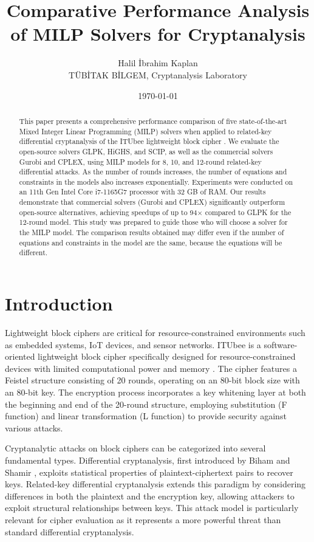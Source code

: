 \documentclass[11pt,a4paper]{article}
\title{Comparative Performance Analysis of MILP Solvers for Cryptanalysis}
\author{Halil İbrahim Kaplan\\TÜBİTAK BİLGEM, Cryptanalysis Laboratory}
\date{\today}
\begin{document}
\maketitle

\begin{abstract}
This paper presents a comprehensive performance comparison of five state-of-the-art Mixed Integer Linear Programming (MILP) solvers when applied to related-key differential cryptanalysis of the ITUbee lightweight block cipher \cite{karakoc2013itubee}. We evaluate the open-source solvers GLPK, HiGHS, and SCIP, as well as the commercial solvers Gurobi and CPLEX, using MILP models for 8, 10, and 12-round related-key differential attacks. As the number of rounds increases, the number of equations and constraints in the models also increases exponentially. Experiments were conducted on an 11th Gen Intel Core i7-1165G7 processor with 32 GB of RAM. Our results demonstrate that commercial solvers (Gurobi and CPLEX) significantly outperform open-source alternatives, achieving speedups of up to 94$\times$ compared to GLPK for the 12-round model. This study was prepared to guide those who will choose a solver for the MILP model. The comparison results obtained may differ even if the number of equations and constraints in the model are the same, because the equations will be different.
\end{abstract}

\section{Introduction}
Lightweight block ciphers are critical for resource-constrained environments such as embedded systems, IoT devices, and sensor networks. ITUbee is a software-oriented lightweight block cipher specifically designed for resource-constrained devices with limited computational power and memory \cite{karakoc2013itubee}. The cipher features a Feistel structure consisting of 20 rounds, operating on an 80-bit block size with an 80-bit key. The encryption process incorporates a key whitening layer at both the beginning and end of the 20-round structure, employing substitution (F function) and linear transformation (L function) to provide security against various attacks.

Cryptanalytic attacks on block ciphers can be categorized into several fundamental types. Differential cryptanalysis, first introduced by Biham and Shamir \cite{biham1990differential}, exploits statistical properties of plaintext-ciphertext pairs to recover keys. Related-key differential cryptanalysis extends this paradigm by considering differences in both the plaintext and the encryption key, allowing attackers to exploit structural relationships between keys. This attack model is particularly relevant for cipher evaluation as it represents a more powerful threat than standard differential cryptanalysis.
\end{document}
